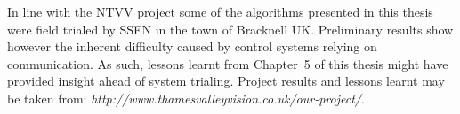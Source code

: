 In line with the NTVV project some of the algorithms presented in this thesis were field trialed by SSEN in the town of Bracknell UK. Preliminary results show however the inherent difficulty caused by control systems relying on communication. As such, lessons learnt from Chapter~5 of this thesis might have provided insight ahead of system trialing. Project results and lessons learnt may be taken from: \textit{http://www.thamesvalleyvision.co.uk/our-project/}.



